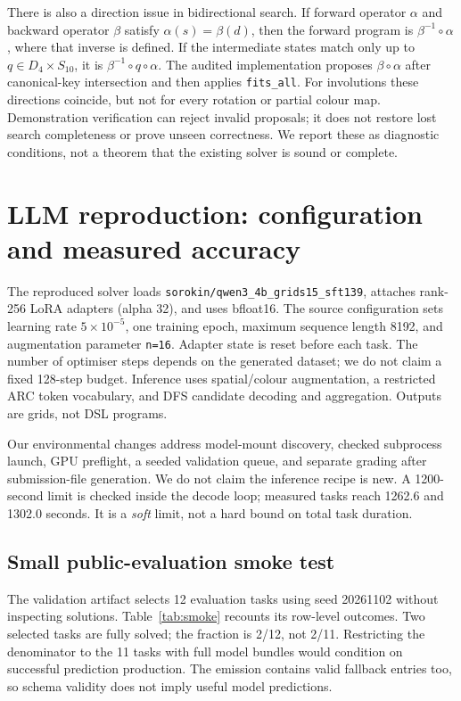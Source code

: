 \documentclass[10pt,a4paper]{article}
\begin{document}
There is also a direction issue in bidirectional search. If forward operator $\alpha$ and backward operator $\beta$ satisfy
$\alpha(s)=\beta(d)$, then the forward program is $\beta^{-1}\circ\alpha$, where that inverse is defined. If the intermediate states match only up to $q\in D_4\times S_{10}$, it is $\beta^{-1}\circ q\circ\alpha$. The audited implementation proposes $\beta\circ\alpha$ after canonical-key intersection and then applies \texttt{fits\_all}. For involutions these directions coincide, but not for every rotation or partial colour map. Demonstration verification can reject invalid proposals; it does not restore lost search completeness or prove unseen correctness. We report these as diagnostic conditions, not a theorem that the existing solver is sound or complete.

\section{LLM reproduction: configuration and measured accuracy}
The reproduced solver loads \texttt{sorokin/qwen3\_4b\_grids15\_sft139}, attaches rank-256 LoRA adapters (alpha 32), and uses bfloat16. The source configuration sets learning rate $5\times10^{-5}$, one training epoch, maximum sequence length 8192, and augmentation parameter \texttt{n=16}. Adapter state is reset before each task. The number of optimiser steps depends on the generated dataset; we do not claim a fixed 128-step budget. Inference uses spatial/colour augmentation, a restricted ARC token vocabulary, and DFS candidate decoding and aggregation. Outputs are grids, not DSL programs.

Our environmental changes address model-mount discovery, checked subprocess launch, GPU preflight, a seeded validation queue, and separate grading after submission-file generation. We do not claim the inference recipe is new. A 1200-second limit is checked inside the decode loop; measured tasks reach 1262.6 and 1302.0 seconds. It is a \emph{soft} limit, not a hard bound on total task duration.

\subsection{Small public-evaluation smoke test}
The validation artifact selects 12 evaluation tasks using seed 20261102 without inspecting solutions. Table~\ref{tab:smoke} recounts its row-level outcomes. Two selected tasks are fully solved; the fraction is 2/12, not 2/11. Restricting the denominator to the 11 tasks with full model bundles would condition on successful prediction production. The emission contains valid fallback entries too, so schema validity does not imply useful model predictions.
\end{document}

